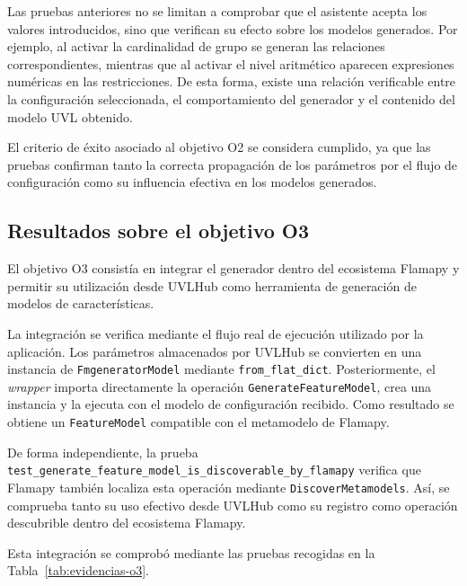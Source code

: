 Las pruebas anteriores no se limitan a comprobar que el asistente acepta los
valores introducidos, sino que verifican su efecto sobre los modelos
generados. Por ejemplo, al activar la cardinalidad de grupo se generan las
relaciones correspondientes, mientras que al activar el nivel aritmético
aparecen expresiones numéricas en las restricciones. De esta forma, existe una
relación verificable entre la configuración seleccionada, el comportamiento del
generador y el contenido del modelo UVL obtenido.

El criterio de éxito asociado al objetivo O2 se considera cumplido, ya que las
pruebas confirman tanto la correcta propagación de los parámetros por el flujo
de configuración como su influencia efectiva en los modelos generados.

\subsection{Resultados sobre el objetivo O3}
\label{subsec:resultados_o3}

El objetivo O3 consistía en integrar el generador dentro del ecosistema
Flamapy y permitir su utilización desde UVLHub como herramienta de generación
de modelos de características.

La integración se verifica mediante el flujo real de ejecución utilizado por
la aplicación. Los parámetros almacenados por UVLHub se convierten en una
instancia de \texttt{FmgeneratorModel} mediante
\texttt{from\_flat\_dict}. Posteriormente, el \textit{wrapper} importa directamente la operación
\texttt{GenerateFeatureModel}, crea una instancia y la ejecuta con el modelo
de configuración recibido. Como resultado se obtiene un
\texttt{FeatureModel} compatible con el metamodelo de Flamapy.

De forma independiente, la prueba \newline
\texttt{test\_generate\_feature\_model\_is\_discoverable\_by\_flamapy}
verifica que Flamapy también localiza esta operación mediante
\texttt{DiscoverMetamodels}. Así, se comprueba tanto su uso efectivo desde
UVLHub como su registro como operación descubrible dentro del ecosistema
Flamapy.

Esta integración se comprobó mediante las pruebas recogidas en la
Tabla~\ref{tab:evidencias-o3}.


